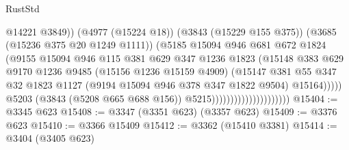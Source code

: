 \begin{lexlean}{RustStd}
\begin{coremodule}
                                                    @14221
                                                    @3849))
                                                (@4977 (@15224 @18))
                                                (@3843 (@15229 @155 @375))
                                                (@3685 (@15236 @375 @20 @1249 @1111))
                                                (@5185
                                                  @15094
                                                  @946
                                                  @681
                                                  @672
                                                  @1824
                                                  (@9155
                                                    @15094
                                                    @946
                                                    @115
                                                    @381
                                                    @629
                                                    @347
                                                    @1236
                                                    @1823
                                                    (@15148
                                                      @383
                                                      @629
                                                      @9170
                                                      @1236
                                                      @9485
                                                      (@15156 @1236 @15159 @4909)
                                                      (@15147
                                                        @381
                                                        @55
                                                        @347
                                                        @32
                                                        @1823
                                                        @1127
                                                        (@9194 @15094 @946 @378 @347 @1822 @9504)
                                                        @15164)))))
                                              @5203
                                              (@3843 (@5208 @665 @688 @156))
                                              @5215)))))))))))))))))))))
@15404 := @3345 @623
@15408 := @3347 (@3351 @623) (@3357 @623)
@15409 := @3376 @623
@15410 := @3366 @15409
@15412 := @3362 (@15410 @3381)
@15414 := @3404 (@3405 @623)

\end{coremodule}
\end{lexlean}
